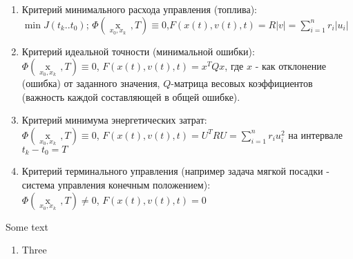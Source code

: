 \documentclass[preprint,russian,a5paper,10pt,twoside]{ncc}
\begin{document}
\begin{itemize}
\begin{enumerate}
\begin{itemize}
\end{itemize}
\item Критерий минимального расхода управления (топлива): 
\\\begin{math}\min J\left( {{t}_{k}}..{{t}_{0}} \right)\end{math}; $\Phi \left( \underset{{{x}_{0}},{{x}_{k}}}{\mathop{x\left( T \right)}}\,,T \right)\equiv 0$,$F\left( x\left( t \right),v\left( t \right),t \right)=R\left| v \right|=\sum\limits_{i=1}^{n}{{{r}_{i}}}\left| {{u}_{i}} \right|$
\item Критерий идеальной точности (минимальной ошибки):\\\begin{math}\Phi \left( \underset{{{x}_{0}},{{x}_{k}}}{\mathop{x\left( T \right)}}\,,T \right)\equiv 0\end{math}, \begin{math}F\left( x\left( t \right),v\left( t \right),t \right)={{x}^{T}}Qx\end{math}, где $x$ - как отклонение (ошибка) от заданного значения, $Q$-матрица весовых коэффициентов (важность каждой составляющей в общей ошибке).
\item Критерий минимума энергетических затрат:\\\begin{math}\Phi \left( \underset{{{x}_{0}},{{x}_{k}}}{\mathop{x\left( T \right)}}\,,T \right)\equiv 0\end{math}, \begin{math}F\left( x\left( t \right),v\left( t \right),t \right)={{U}^{T}}RU=\sum\limits_{i=1}^{n}{{{r}_{i}}}u_{i}^{2}\end{math} на интервале ${{t}_{k}}-{{t}_{0}}=T$
\item Критерий терминального управления (например задача мягкой посадки - система управления конечным положением):\\
$\Phi \left( \underset{{{x}_{0}},{{x}_{k}}}{\mathop{x\left( T \right)}}\,,T \right)\ne 0$, $F\left( x\left( t \right),v\left( t \right),t \right)=0$
\end{enumerate}
Some text
\begin{enumerate}[resume]
  \item Three
\end{enumerate}


\end{itemize}








\par
\end{document}
